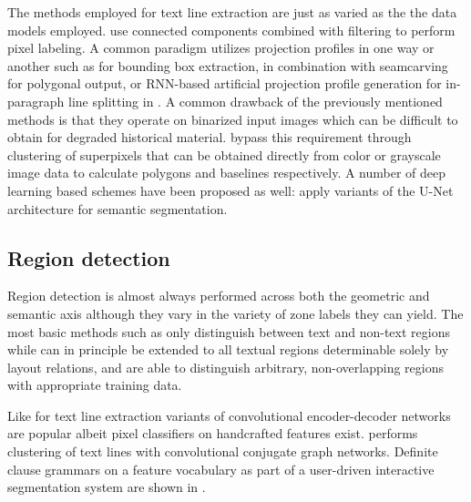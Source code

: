 The methods employed for text line extraction are just as varied as the the
data models employed. \cite{ouwayed2012general, borse2014language} use
connected components combined with filtering to perform pixel labeling. A
common paradigm utilizes projection profiles in one way or another such as
\cite{diem2013text} for bounding box extraction, \cite{arvanitopoulos2014seam,
saabni2014text} in combination with seamcarving for polygonal output, or
RNN-based artificial projection profile generation for in-paragraph line
splitting in \cite{moysset2015paragraph}. A common drawback of the previously
mentioned methods is that they operate on binarized input images which can be
difficult to obtain for degraded historical material.
\cite{garz2012binarization, ahn2017textline, gruuening2017robust}
bypass this requirement through clustering of superpixels that can be obtained
directly from color or grayscale image data to calculate polygons and baselines
respectively. A number of deep learning based schemes have been proposed as
well: \cite{mechi2019text, quiros2018multi, oliveira2018dhsegment}
apply variants of the U-Net architecture for semantic segmentation.


\subsection{Region detection}

Region detection is almost always performed across both the geometric and
semantic axis although they vary in the variety of zone labels they can
yield. The most basic methods such as \cite{baechler2011multi,
chen2014page} only distinguish between text and non-text regions while
\cite{dejean2019versatile} can in principle be extended to all textual regions
determinable solely by layout relations, and \cite{soullard2020multi,
quiros2018multi, oliveira2018dhsegment, kaddas2018deep} are able to distinguish
arbitrary, non-overlapping regions with appropriate training data.

Like for text line extraction \cite{soullard2020multi,quiros2018multi,
oliveira2018dhsegment} variants of convolutional
encoder-decoder networks are popular albeit pixel classifiers on handcrafted
features \cite{chen2014page, baechler2011multi} exist.
\cite{dejean2019versatile} performs clustering of text lines with convolutional
conjugate graph networks.  Definite clause grammars on a feature vocabulary as
part of a user-driven interactive segmentation system are shown in
\cite{lemaitre2008multiresolution}.

